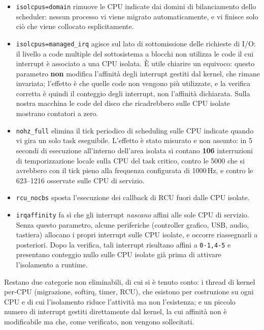\begin{itemize}
\item \texttt{isolcpus=domain} rimuove le CPU indicate dai domini di bilanciamento dello
scheduler: nessun processo vi viene migrato automaticamente, e vi finisce solo ci\`o che viene
collocato esplicitamente.

\item \texttt{isolcpus=managed\_irq} agisce sul lato di sottomissione delle richieste di I/O: il
livello a code multiple del sottosistema a blocchi non utilizza le code il cui interrupt \`e
associato a una CPU isolata. \`E utile chiarire un equivoco: questo parametro \textbf{non} modifica
l'affinit\`a degli interrupt gestiti dal kernel, che rimane invariata; l'effetto \`e che quelle
code non vengono pi\`u utilizzate, e la verifica corretta \`e quindi il conteggio degli interrupt,
non l'affinit\`a dichiarata. Sulla nostra macchina le code del disco che ricadrebbero sulle CPU
isolate mostrano contatori a zero.

\item \texttt{nohz\_full} elimina il tick periodico di scheduling sulle CPU indicate quando vi
gira un solo task eseguibile. L'effetto \`e stato misurato e non assunto: in 5 secondi di
esecuzione all'interno dell'area isolata si contano \textbf{106} interruzioni di temporizzazione
locale sulla CPU del task critico, contro le 5000 che si avrebbero con il tick pieno alla
frequenza configurata di 1000\,Hz, e contro le 623--1216 osservate sulle CPU di servizio.

\item \texttt{rcu\_nocbs} sposta l'esecuzione dei callback di RCU fuori dalle CPU isolate.

\item \texttt{irqaffinity} fa s\`i che gli interrupt \emph{nascano} affini alle sole CPU di
servizio. Senza questo parametro, alcune periferiche (controller grafico, USB, audio, tastiera)
allocano i propri interrupt sulle CPU isolate, e occorre riassegnarli a posteriori. Dopo la
verifica, tali interrupt risultano affini a \texttt{0-1,4-5} e presentano conteggio nullo sulle
CPU isolate gi\`a prima di attivare l'isolamento a runtime.
\end{itemize}

Restano due categorie non eliminabili, di cui si \`e tenuto conto: i thread di kernel per-CPU
(migrazione, softirq, timer, RCU), che esistono per costruzione su ogni CPU e di cui l'isolamento
riduce l'attivit\`a ma non l'esistenza; e un piccolo numero di interrupt gestiti direttamente dal
kernel, la cui affinit\`a non \`e modificabile ma che, come verificato, non vengono sollecitati.

